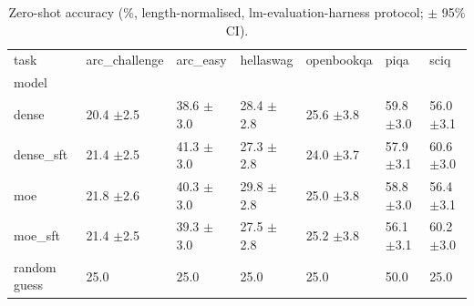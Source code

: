 \begin{table}
\caption{Zero-shot accuracy (\%, length-normalised, lm-evaluation-harness protocol; $\pm$ 95\% CI).}
\label{tab:bench}
\begin{tabular}{lllllll}
\toprule
task & arc_challenge & arc_easy & hellaswag & openbookqa & piqa & sciq \\
model &  &  &  &  &  &  \\
\midrule
dense & 20.4 \scriptsize{$\pm$2.5} & 38.6 \scriptsize{$\pm$3.0} & 28.4 \scriptsize{$\pm$2.8} & 25.6 \scriptsize{$\pm$3.8} & 59.8 \scriptsize{$\pm$3.0} & 56.0 \scriptsize{$\pm$3.1} \\
dense_sft & 21.4 \scriptsize{$\pm$2.5} & 41.3 \scriptsize{$\pm$3.0} & 27.3 \scriptsize{$\pm$2.8} & 24.0 \scriptsize{$\pm$3.7} & 57.9 \scriptsize{$\pm$3.1} & 60.6 \scriptsize{$\pm$3.0} \\
moe & 21.8 \scriptsize{$\pm$2.6} & 40.3 \scriptsize{$\pm$3.0} & 29.8 \scriptsize{$\pm$2.8} & 25.0 \scriptsize{$\pm$3.8} & 58.8 \scriptsize{$\pm$3.0} & 56.4 \scriptsize{$\pm$3.1} \\
moe_sft & 21.4 \scriptsize{$\pm$2.5} & 39.3 \scriptsize{$\pm$3.0} & 27.5 \scriptsize{$\pm$2.8} & 25.2 \scriptsize{$\pm$3.8} & 56.1 \scriptsize{$\pm$3.1} & 60.2 \scriptsize{$\pm$3.0} \\
random guess & 25.0 & 25.0 & 25.0 & 25.0 & 50.0 & 25.0 \\
\bottomrule
\end{tabular}
\end{table}
